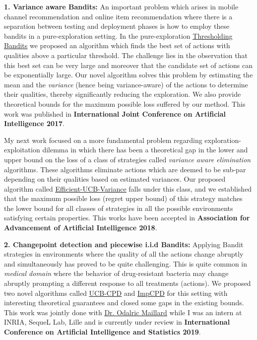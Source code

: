\documentclass{article}
\begin{document}
\textbf{1. Variance aware Bandits:} An important problem which arises in mobile channel recommendation and online item recommendation where there is a separation between testing and deployment phases is how to employ these bandits in a pure-exploration setting. In the pure-exploration \href{https://www.ijcai.org/proceedings/2017/0350.pdf}{\underline{\color{blue}Thresholding Bandits}} \citep{mukherjee2016} we proposed an algorithm which finds the best set of actions with qualities above a particular threshold. The challenge lies in the observation that this best set can be very large and moreover that the candidate set of actions can be exponentially large. Our novel algorithm solves this problem by estimating the mean and the \textit{variance} (hence being variance-aware) of the actions to determine their qualities, thereby significantly reducing the exploration. We also provide theoretical bounds for the maximum possible loss suffered by our
method. This work was published in \textbf{International Joint Conference on Artificial Intelligence 2017}.


My next work focused on a more fundamental problem regarding exploration-exploitation dilemma in which there has been a theoretical gap in the lower and upper bound on the loss of a class of strategies called \textit{variance aware elimination} algorithms. These algorithms eliminate actions which are deemed to be sub-par depending on their qualities based on estimated variances. Our proposed algorithm called \href{https://www.aaai.org/ocs/index.php/AAAI/AAAI18/paper/view/16111}{\underline{\color{blue}Efficient-UCB-Variance}} \citep{mukherjee2018} falls under this class, and we established that the maximum possible loss (regret upper bound) of this strategy matches the lower bound for all classes of strategies in all the possible environments satisfying certain properties. This works have been accepted in \textbf{Association for Advancement of Artificial Intelligence 2018}.

\textbf{2. Changepoint detection and piecewise i.i.d Bandits:}  Applying Bandit strategies in environments where the quality of all the actions change abruptly and simultaneously has proved to be quite challenging. This is quite common in \textit{medical domain} where the behavior of drug-resistant bacteria may change abruptly prompting a different response to all treatments (actions). We proposed two novel algorithms called \href{https://subhojyoti.github.io/pdf/aistats_2019.pdf}{\underline{\color{blue}UCB-CPD}} and \href{https://subhojyoti.github.io/pdf/aistats_2019.pdf}{\underline{\color{blue}ImpCPD}} for this setting with interesting theoretical guarantees and closed some gaps in the existing bounds. This work was jointly done with \href{https://scholar.google.com/citations?user=7EweMdoAAAAJ&hl=en}{\underline{\color{red}Dr. Odalric Maillard}} while I was an intern at INRIA, SequeL Lab, Lille and is currently under review in \textbf{International Conference on Artificial Intelligence and Statistics 2019}. 
\end{document}
